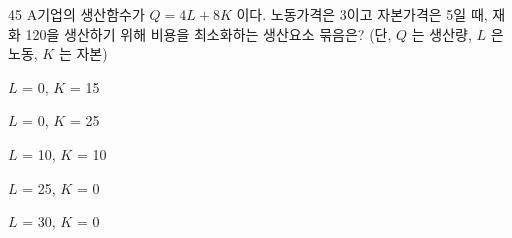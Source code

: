 \begin{question}{45}
A기업의 생산함수가 $Q=4L+8K$ 이다. 노동가격은 3이고 자본가격은 5일 때, 재화 120을 생산하기 위해 비용을 최소화하는 생산요소 묶음은? (단, $Q$ 는 생산량, $L$ 은 노동, $K$ 는 자본)
\begin{choices}
  \item $L$ = 0, $K$ = 15
  \item $L$ = 0, $K$ = 25
  \item $L$ = 10, $K$ = 10
  \item $L$ = 25, $K$ = 0
  \item $L$ = 30, $K$ = 0
\end{choices}
\end{question}
